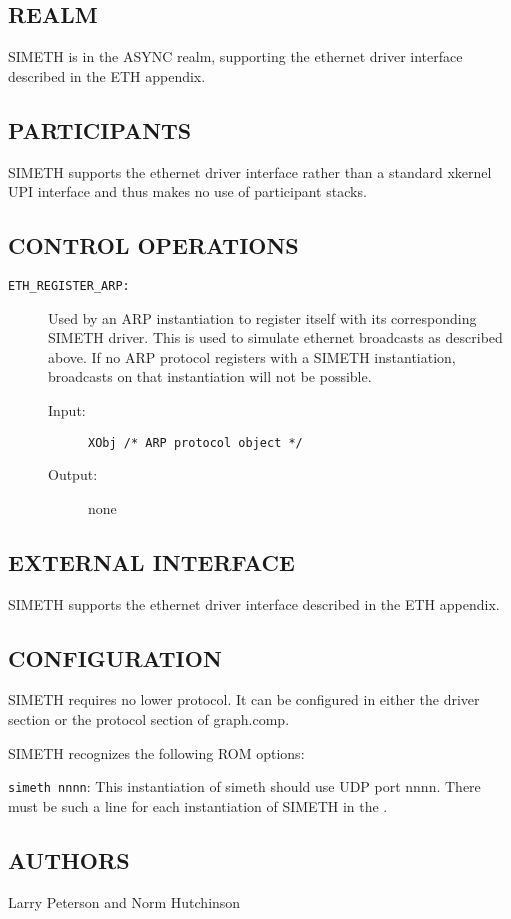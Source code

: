 \subsection*{REALM}

SIMETH is in the ASYNC realm, supporting the ethernet driver interface
described in the ETH appendix.


\subsection*{PARTICIPANTS}

SIMETH supports the ethernet driver interface rather than a standard
xkernel UPI interface and thus makes no use of participant stacks.




\subsection*{CONTROL OPERATIONS}

\begin{description}

\item[{\tt ETH\_REGISTER\_ARP:}]
Used by an ARP instantiation to register itself with its corresponding
SIMETH driver.  This is used to simulate ethernet broadcasts as
described above.  If no ARP protocol registers with a SIMETH
instantiation, broadcasts on that instantiation will not be
possible. 
\begin{description}
\item[{\rm Input:}] {\tt XObj /* ARP protocol object */ }
\item[{\rm Output:}] none
\end{description}

\end{description}


\subsection*{EXTERNAL INTERFACE}

SIMETH supports the ethernet driver interface
described in the ETH appendix.


\subsection*{CONFIGURATION}

SIMETH requires no lower protocol.  It can be configured in either the
driver section or the protocol section of graph.comp.

\medskip

\noindent
SIMETH recognizes the following ROM options:

\smallskip

{\tt simeth nnnn}:
This instantiation of simeth should use UDP port nnnn.  There must be
such a line for each instantiation of SIMETH in the \xk{}.


\subsection*{AUTHORS}

\noindent Larry Peterson and Norm Hutchinson
